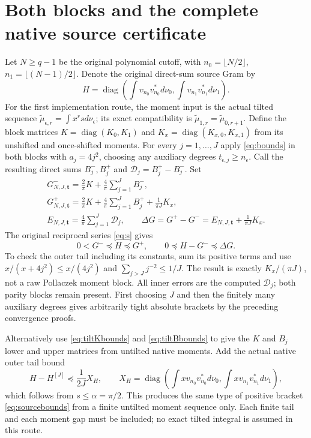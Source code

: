 \documentclass[11pt]{article}
\newcommand{\diag}{\operatorname{diag}}
\begin{document}
\section{Both blocks and the complete native source certificate}

Let $N\ge q-1$ be the original polynomial cutoff, with
$n_0=\lfloor N/2\rfloor$, $n_1=\lfloor(N-1)/2\rfloor$.  Denote
the original direct-sum source Gram by
\[
 H=\diag\left(\int v_{n_0}v_{n_0}^*d\nu_0,
                  \int v_{n_1}v_{n_1}^*d\nu_1\right).
\]
For the first implementation route, the moment input is the actual
tilted sequence $\widetilde\mu_{\epsilon,r}=\int x^rsd\nu_\epsilon$;
its exact compatibility is
$\widetilde\mu_{1,r}=\widetilde\mu_{0,r+1}$.  Define the block
matrices $K=\diag(K_0,K_1)$ and
$K_x=\diag(K_{x,0},K_{x,1})$ from its unshifted and once-shifted
moments.  For every $j=1,\ldots,J$ apply \eqref{eq:bounds} in
both blocks with $a_j=4j^2$, choosing any auxiliary degrees
$t_{\epsilon,j}\ge n_\epsilon$.  Call the resulting direct sums
$B_j^-,B_j^+$ and $\mathcal D_j=B_j^+-B_j^-$.  Set
\begin{equation}\label{eq:Gpm}
 \begin{gathered}
 G^-_{N,J,\mathbf t}=\frac2\pi K+\frac4\pi\sum_{j=1}^JB_j^-,\\
 G^+_{N,J,\mathbf t}=\frac2\pi K+\frac4\pi\sum_{j=1}^JB_j^+
                       +\frac1{\pi J}K_x,\\
 E_{N,J,\mathbf t}=\frac4\pi\sum_{j=1}^J\mathcal D_j,
 \qquad\Delta G=G^+-G^-=E_{N,J,\mathbf t}+\frac1{\pi J}K_x.
 \end{gathered}
\end{equation}
The original reciprocal series \eqref{eq:s} gives
\begin{equation}\label{eq:sourcebounds}
 \boxed{0<G^-\preceq H\preceq G^+,\qquad
 0\preceq H-G^-\preceq\Delta G.}
\end{equation}
To check the outer tail including its constants, sum its positive
terms and use $x/(x+4j^2)\le x/(4j^2)$ and
$\sum_{j>J}j^{-2}\le1/J$.  The result is exactly
$K_x/(\pi J)$, not a raw Pollaczek moment block.  All inner errors
are the computed $\mathcal D_j$; both parity blocks remain present.
First choosing $J$ and then the finitely many auxiliary degrees gives
arbitrarily tight absolute brackets by the preceding convergence proofs.

Alternatively use \eqref{eq:tiltKbounds} and
\eqref{eq:tiltBbounds} to give the $K$ and $B_j$ lower and upper
matrices from untilted native moments.  Add the actual native outer
tail bound
\begin{equation}\label{eq:untiltedouter}
 H-H^{[J]}\preceq\frac1{2J}X_H,\qquad
 X_H=\diag\left(\int xv_{n_0}v_{n_0}^*d\nu_0,
                    \int xv_{n_1}v_{n_1}^*d\nu_1\right),
\end{equation}
which follows from $s\le\alpha=\pi/2$.  This produces the same
type of positive bracket \eqref{eq:sourcebounds} from a finite
untilted moment sequence only.  Each finite tail and each moment gap
must be included; no exact tilted integral is assumed in this route.
\end{document}
